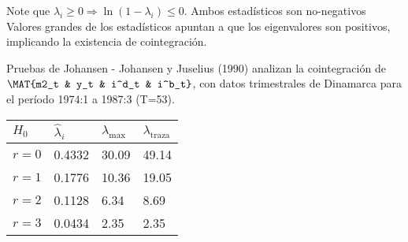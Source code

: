 Note que $\lambda_i \geq 0 \Rightarrow \ln\left(1-\lambda_i\right) \leq 0$. Ambos estadísticos son no-negativos
Valores grandes de los estadísticos apuntan a que los eigenvalores son positivos, implicando la existencia de cointegración.




\begin{EXAMPLE}{Pruebas de Johansen}
- Johansen y Juselius (1990) analizan la cointegración de $\MAT{m2_t & y_t & i^d_t & i^b_t}$, con datos trimestrales de Dinamarca para el período 1974:1 a 1987:3 (T=53).

\begin{center}
\small  %
\begin{tabu} to 0.7\textwidth {X[1.2cl]X[cm]X[cm]X[cm]}
\toprule
$H_0$ & $\hat{\lambda}_i$ & $\lambda_{\max}$ & $\lambda_{\text{traza}}$  \\
\midrule
$r=0$ & 0.4332 & 30.09 & 49.14 \\
$r=1$ & 0.1776 & 10.36 & 19.05 \\
$r=2$ & 0.1128 & 6.34 & 8.69 \\
$r=3$ & 0.0434 & 2.35 & 2.35 \\
\bottomrule
\end{tabu}
\end{center}

\end{EXAMPLE}




